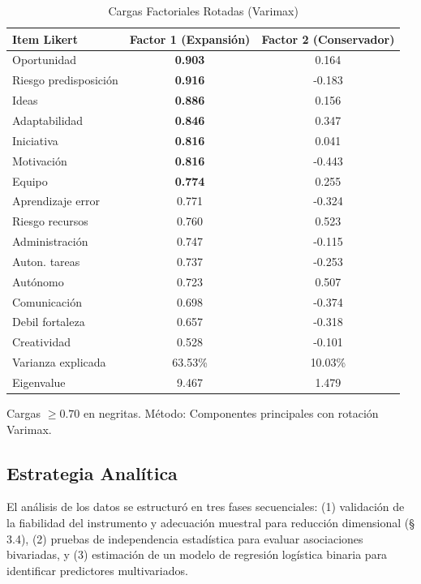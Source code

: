 \documentclass[11pt,a4paper]{article}
\begin{document}
\begin{table}[H]
\centering
\caption{Cargas Factoriales Rotadas (Varimax)}
\small
\begin{tabular}{@{}lcc@{}}
\toprule
Item Likert & Factor 1 (Expansi\'on) & Factor 2 (Conservador) \\ \midrule
Oportunidad              & \textbf{0.903}             & 0.164 \\
Riesgo predisposición    & \textbf{0.916}             & -0.183 \\
Ideas                    & \textbf{0.886}             & 0.156 \\
Adaptabilidad            & \textbf{0.846}             & 0.347 \\
Iniciativa               & \textbf{0.816}             & 0.041 \\
Motivación               & \textbf{0.816}             & -0.443 \\
Equipo                   & \textbf{0.774}             & 0.255 \\
Aprendizaje error          & 0.771               & -0.324 \\
Riesgo recursos            & 0.760               & 0.523 \\
Administración             & 0.747               & -0.115 \\
Auton. tareas              & 0.737               & -0.253 \\
Autónomo                   & 0.723               & 0.507 \\
Comunicación               & 0.698               & -0.374 \\
Debil fortaleza            & 0.657               & -0.318 \\
Creatividad                & 0.528               & -0.101 \\ \midrule
Varianza explicada         & 63.53\%              & 10.03\% \\
Eigenvalue                 & 9.467               & 1.479 \\ \bottomrule
\end{tabular}
\par\smallskip
\footnotesize{Cargas $\geq 0.70$ en negritas. Método: Componentes principales con rotación Varimax.}
\end{table}

\subsection{Estrategia Anal\'itica}
El análisis de los datos se estructuró en tres fases secuenciales: (1) validación de la fiabilidad del instrumento y adecuación muestral para reducción dimensional (§ 3.4), (2) pruebas de independencia estadística para evaluar asociaciones bivariadas, y (3) estimación de un modelo de regresión logística binaria para identificar predictores multivariados.
\end{document}
